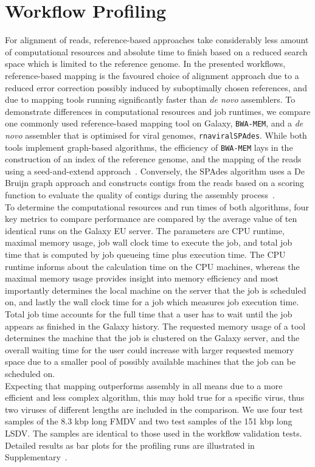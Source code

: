 \section{Workflow Profiling}
For alignment of reads, reference-based approaches take considerably less amount of computational resources and absolute time to finish based on a reduced search space which is limited to the reference genome. In the presented workflows, reference-based mapping is the favoured choice of alignment approach due to a reduced error correction possibly induced by suboptimally chosen references, and due to mapping tools running significantly faster than \textit{de novo} assemblers. To demonstrate differences in computational resources and job runtimes, we compare one commonly used reference-based mapping tool on Galaxy, \texttt{BWA-MEM}, and a \textit{de novo} assembler that is optimised for viral genomes, \texttt{rnaviralSPAdes}. While both tools implement graph-based algorithms, the efficiency of \texttt{BWA-MEM} lays in the construction of an index of the reference genome, and the mapping of the reads using a seed-and-extend approach~\cite{li2013aligning}. Conversely, the SPAdes algorithm uses a De Bruijn graph approach and constructs contigs from the reads based on a scoring function to evaluate the quality of contigs during the assembly process~\cite{bankevich2012spades}.\\
To determine the computational resources and run times of both algorithms, four key metrics to compare performance are compared by the average value of ten identical runs on the Galaxy EU server. The parameters are CPU runtime, maximal memory usage, job wall clock time to execute the job, and total job time that is computed by job queueing time plus execution time. The CPU runtime informs about the calculation time on the CPU machines, whereas the maximal memory usage provides insight into memory efficiency and most importantly determines the local machine on the server that the job is scheduled on, and lastly the wall clock time for a job which measures job execution time. Total job time accounts for the full time that a user has to wait until the job appears as finished in the Galaxy history. The requested memory usage of a tool determines the machine that the job is clustered on the Galaxy server, and the overall waiting time for the user could increase with larger requested memory space due to a smaller pool of possibly available machines that the job can be scheduled on.\\
Expecting that mapping outperforms assembly in all means due to a more efficient and less complex algorithm, this may hold true for a specific virus, thus two viruses of different lengths are included in the comparison. We use four test samples of the 8.3 kbp long \ac{FMDV} and two test samples of the 151 kbp long \ac{LSDV}. The samples are identical to those used in the workflow validation tests. Detailed results as bar plots for the profiling runs are illustrated in Supplementary~. \\

